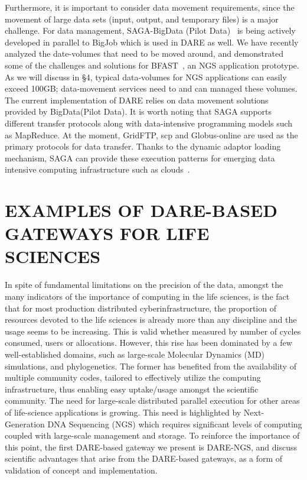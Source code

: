 \documentclass[]{svjour3}
\begin{document}
Furthermore, it is important to consider data movement requirements,
since the movement of large data sets (input, output, and temporary
files) is a major challenge.  For data management, SAGA-BigData (Pilot
Data)~\cite{pstar12} is being actively developed in parallel to BigJob
which is used in DARE as well.  We have recently analyzed the
date-volumes that need to be moved around, and demonstrated some of
the challenges and solutions for BFAST~\cite{dare-ecmls11}, an NGS
application prototype.  As we will discuss in \S4, typical
data-volumes for NGS applications can easily exceed 100GB;
data-movement services need to and can managed these volumes. The
current implementation of DARE relies on data movement solutions
provided by BigData(Pilot Data).  It is worth noting that SAGA
supports different transfer protocols along with data-intensive
programming models such as MapReduce.  At the moment, GridFTP, scp and
Globus-online are used as the primary protocols for data transfer.
Thanks to the dynamic adaptor loading mechanism, SAGA can provide
these execution patterns for emerging data intensive computing
infrastructure such as
clouds~\cite{bigjob_cloudcom10,saga_bigjob_condor_cloud}.




\section{EXAMPLES OF DARE-BASED GATEWAYS FOR LIFE SCIENCES}

In spite of fundamental limitations on the precision of the data,
amongst the many indicators of the importance of computing in the life
sciences, is the fact that for most production distributed
cyberinfrastructure, the proportion of resources devoted to the life
sciences is already more than any discipline and the usage seems to be
increasing. This is valid whether measured by number of cycles
consumed, users or allocations.  However, this rise has been dominated
by a few well-established domains, such as large-scale Molecular
Dynamics (MD) simulations, and phylogenetics.  The former has
benefited from the availability of multiple community codes, tailored
to effectively utilize the computing infrastructure, thus enabling
easy uptake/usage amongst the scientific community.  The need for
large-scale distributed parallel execution for other areas of
life-science applications is growing.  This need is highlighted by
Next-Generation DNA Sequencing (NGS) which requires significant levels
of computing coupled with large-scale management and storage.  To
reinforce the importance of this point, the first DARE-based gateway
we present is DARE-NGS, and discuss scientific advantages that arise
from the DARE-based gateways, as a form of validation of concept and
implementation.
\end{document}
